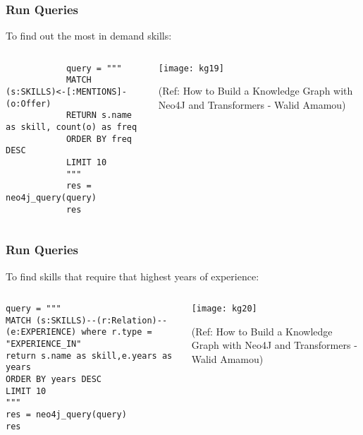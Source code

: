 \begin{frame}[fragile]\frametitle{Run Queries}

To find out the most in demand skills:

\begin{columns}
    \begin{column}[T]{0.6\linewidth}
		
			\begin{lstlisting}
			query = """
			MATCH (s:SKILLS)<-[:MENTIONS]-(o:Offer)
			RETURN s.name as skill, count(o) as freq
			ORDER BY freq DESC
			LIMIT 10
			"""
			res = neo4j_query(query)
			res
			\end{lstlisting}
    \end{column}
    \begin{column}[T]{0.4\linewidth}
			\begin{center}
			\texttt{[image: kg19]}
			\end{center}	
			
			{\tiny (Ref: How to Build a Knowledge Graph with Neo4J and Transformers - Walid Amamou)}	
    \end{column}			
\end{columns}
			
\end{frame}

\begin{frame}[fragile]\frametitle{Run Queries}

To find skills that require that highest years of experience:

\begin{columns}
    \begin{column}[T]{0.6\linewidth}
		
			\begin{lstlisting}
query = """
MATCH (s:SKILLS)--(r:Relation)--(e:EXPERIENCE) where r.type = "EXPERIENCE_IN"
return s.name as skill,e.years as years
ORDER BY years DESC
LIMIT 10
"""
res = neo4j_query(query)
res
			\end{lstlisting}
    \end{column}
    \begin{column}[T]{0.4\linewidth}
			\begin{center}
			\texttt{[image: kg20]}
			\end{center}	
			
			{\tiny (Ref: How to Build a Knowledge Graph with Neo4J and Transformers - Walid Amamou)}	
    \end{column}			
\end{columns}
			
\end{frame}


